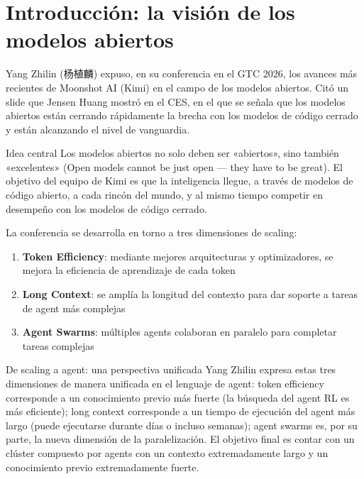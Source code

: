 \section{Introducción: la visión de los modelos abiertos}

Yang Zhilin (杨植麟) expuso, en su conferencia en el GTC 2026, los avances más recientes de Moonshot AI (Kimi) en el campo de los modelos abiertos. Citó un slide que Jensen Huang mostró en el CES, en el que se señala que los modelos abiertos están cerrando rápidamente la brecha con los modelos de código cerrado y están alcanzando el nivel de vanguardia.

\begin{importantbox}{Idea central}
Los modelos abiertos no solo deben ser «abiertos», sino también «excelentes» (Open models cannot be just open --- they have to be great). El objetivo del equipo de Kimi es que la inteligencia llegue, a través de modelos de código abierto, a cada rincón del mundo, y al mismo tiempo competir en desempeño con los modelos de código cerrado.
\end{importantbox}

La conferencia se desarrolla en torno a tres dimensiones de scaling:
\begin{enumerate}
    \item \textbf{Token Efficiency}: mediante mejores arquitecturas y optimizadores, se mejora la eficiencia de aprendizaje de cada token
    \item \textbf{Long Context}: se amplía la longitud del contexto para dar soporte a tareas de agent más complejas
    \item \textbf{Agent Swarms}: múltiples agents colaboran en paralelo para completar tareas complejas
\end{enumerate}

\begin{knowledgebox}{De scaling a agent: una perspectiva unificada}
Yang Zhilin expresa estas tres dimensiones de manera unificada en el lenguaje de agent: token efficiency corresponde a un conocimiento previo más fuerte (la búsqueda del agent RL es más eficiente); long context corresponde a un tiempo de ejecución del agent más largo (puede ejecutarse durante días o incluso semanas); agent swarms es, por su parte, la nueva dimensión de la paralelización. El objetivo final es contar con un clúster compuesto por agents con un contexto extremadamente largo y un conocimiento previo extremadamente fuerte.
\end{knowledgebox}

